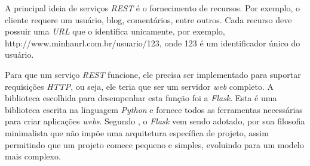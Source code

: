A principal ideia de serviços \emph{REST} é o fornecimento de recursos. 
Por exemplo, o cliente requere um usuário, blog, comentários, entre outros. 
Cada recurso deve possuir uma \emph{URL} que o identifica unicamente, por exemplo, http://www.minhaurl.com.br/usuario/123, onde 123 é um identificador único do usuário.

Para que um serviço \emph{REST} funcione, ele precisa ser implementado para suportar requisições \emph{HTTP}, ou seja, ele teria que ser um servidor \emph{web} completo. 
A biblioteca escolhida para desempenhar esta função foi a \emph{Flask}. 
Esta é uma biblioteca escrita na linguagem \emph{Python} e fornece todos as ferramentas necessárias para criar aplicações \emph{webs}. 
Segundo \cite{Maia2015}, o \emph{Flask} vem sendo adotado, por sua filosofia minimalista que não impõe uma arquitetura específica de projeto, assim permitindo que um projeto comece pequeno e simples, evoluindo para um modelo mais complexo.

